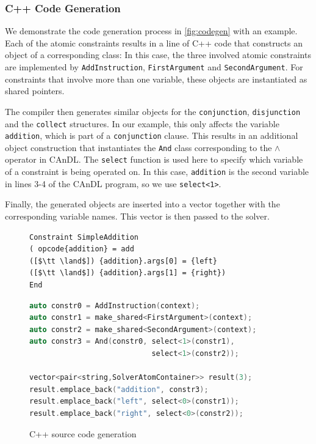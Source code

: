 \subsubsection{C++ Code Generation}

    We demonstrate the code generation process in \autoref{fig:codegen} with an
    example.
    Each of the atomic constraints results in a line of C++ code that constructs
    an object of a corresponding class:
    In this case, the three involved atomic constraints are implemented by
    \texttt{AddInstruction}, \texttt{FirstArgument} and \texttt{SecondArgument}.
    For constraints that involve more than one variable, these objects are
    instantiated as shared pointers.

    The compiler then generates similar objects for the
    \texttt{conjunction}, \texttt{disjunction} and the \texttt{collect} structures.
    In our example, this only affects the variable \texttt{addition}, which is
    part of a \texttt{conjunction} clause.
    This results in an additional object construction that instantiates the
    \texttt{And} class corresponding to the {\bf $\land$} operator in CAnDL.
    The \texttt{select} function is used here to specify which variable of a
    constraint is being operated on.
    In this case, \texttt{addition} is the second variable in lines 3-4 of the
    CAnDL program, so we use \texttt{select<1>}.

    Finally, the generated objects are inserted into a vector together with the
    corresponding variable names.
    This vector is then passed to the solver.

\begin{figure}[ht]
\centering
\begin{lstlisting}[language=CAnDL]
Constraint SimpleAddition
( opcode{addition} = add
([$\tt \land$]) {addition}.args[0] = {left}
([$\tt \land$]) {addition}.args[1] = {right})
End
\end{lstlisting}
\begin{lstlisting}[language=C++]
auto constr0 = AddInstruction(context);
auto constr1 = make_shared<FirstArgument>(context);
auto constr2 = make_shared<SecondArgument>(context);
auto constr3 = And(constr0, select<1>(constr1),
                            select<1>(constr2));

vector<pair<string,SolverAtomContainer>> result(3);
result.emplace_back("addition", constr3);
result.emplace_back("left", select<0>(constr1));
result.emplace_back("right", select<0>(constr2));
\end{lstlisting}
\vspace{-0.3cm}
\caption{C++ source code generation}
\label{fig:codegen}
\end{figure}

